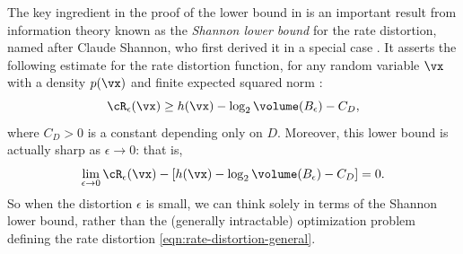 \documentclass[../../book-main.tex]{subfiles}
\begin{document}
\begin{remark}\label{rem:slb}
    The key ingredient in the proof of the lower bound in
     is an important result from
    information theory known as the \textit{Shannon lower bound} for the rate
    distortion, named after Claude Shannon, who first derived it in a
    special case
    \cite{shannon1959coding}. It
    asserts the following estimate for the rate distortion function,
    for any random
    variable $\vx$ with
    a density $p(\vx)$ and finite expected squared norm \cite{Linder1994-ej}:
    \begin{equation}\label{eq:slb}
        \cR_{\epsilon}(\vx)
        \geq
        h(\vx)
        - \log_2 \volume(B_{\epsilon})
        -
        C_D,
    \end{equation}
    where $C_D > 0$ is a constant depending only on $D$. Moreover,
    this lower bound
    is actually sharp as $\epsilon \to 0$: that is,
    \begin{equation}
        \lim_{\epsilon \to 0} \cR_{\epsilon}(\vx) - \left[ h(\vx) - \log_2
        \volume(B_{\epsilon}) - C_D\right] = 0.
    \end{equation}
    So when the distortion $\epsilon$ is small, we can think solely in terms of
    the Shannon lower bound, rather than the (generally intractable)
    optimization problem defining the rate distortion
    \eqref{eqn:rate-distortion-general}.


\end{remark}
\end{document}
